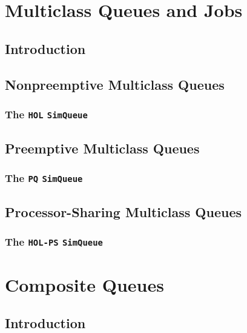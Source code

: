 \documentclass[12pt]{book}
\begin{document}
\chapter{Multiclass Queues and Jobs}

\section{Introduction}

\section{Nonpreemptive Multiclass Queues}

\subsection{The \lstinline{HOL} \lstinline{SimQueue}}
\label{sec:HOL}

\section{Preemptive Multiclass Queues}

\subsection{The \lstinline{PQ} \lstinline{SimQueue}}
\label{sec:PQ}

\section{Processor-Sharing Multiclass Queues}

\subsection{The \lstinline{HOL-PS} \lstinline{SimQueue}}
\label{sec:HOL-PS}

\chapter{Composite Queues}

\section{Introduction}
\end{document}
